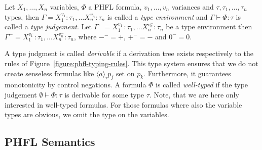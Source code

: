\begin{definition}
    Let $X_1, \dots, X_n$ variables, $\Phi$ a PHFL formula, $v_1, \dots, v_n$ variances and $\tau, \tau_1, \dots,
    \tau_n$ types, then $\Gamma = X_1^{v_1}\colon \tau_1, \dots X_n^{v_n} \colon \tau_n$ is
    called a \emph{type environment} and $\Gamma \vdash \Phi\colon\tau$
    is called a \emph{type judgement}. Let $\Gamma^- = X_1^{v_1^-}\colon \tau_1, \dots
    X_n^{v_n^-} \colon \tau_n$ be a type environment then $\Gamma^- = X_1^{v_1^-}\colon \tau_1, \dots
    X_n^{v_n^-} \colon \tau_n$, where $-^- = +$, $+^- = -$ and $0^- = 0$.
\end{definition}

A type judgment is called \textit{derivable} if a derivation tree exists respectively to the rules of
Figure~\ref{figure:phfl-typing-rules}. This type system ensures that we do not create senseless formulas like
$\langle a \rangle_i p_j$ set on $p_k$. Furthermore, it guarantees monotonicity by control negations. A formula
$\Phi$ is called \textit{well-typed} if the type judgement $\emptyset \vdash \Phi:\tau$ is derivable for some type
$\tau$. Note, that we are here only interested in well-typed formulas. For those formulas where also the variable
types are obvious, we omit the type on the variables.

\subsection{PHFL Semantics}\label{subsec:phflSemantics}

